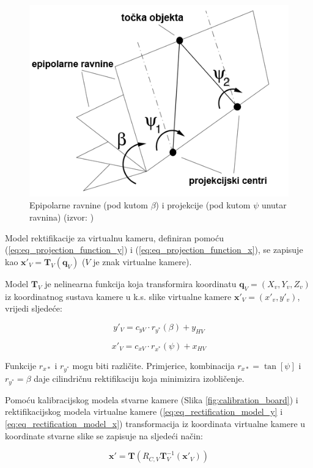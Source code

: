 \documentclass[../seminar.tex]{subfiles}
\begin{document}
\begin{figure}[ht!]
  \centering
    \includegraphics[width=.5\textwidth]{img_010_epipolar_planes_smaller.png}
   \caption{Epipolarne ravnine (pod kutom $\beta$) i projekcije (pod kutom $\psi$ unutar ravnina) (izvor: \cite{Abraham})}
  \label{fig:epipolar_planes}
\end{figure}


Model rektifikacije za virtualnu kameru, definiran pomoću (\ref{eq:eq_projection_function_y}) i (\ref{eq:eq_projection_function_x}), se zapisuje kao $\boldsymbol{x'}_V = \boldsymbol{T}_V (\boldsymbol{q}_V)$ ($V$ je znak virtualne kamere).\cite{Abraham}
 
Model $\boldsymbol{T}_V$ je nelinearna funkcija koja transformira koordinatu $\boldsymbol{q}_V = (X_v,Y_v,Z_v)$ iz koordinatnog sustava kamere u k.s. slike virtualne kamere $\boldsymbol{x'}_V = (x'_v,y'_v)$, vrijedi sljedeće:

\begin{equation}
\label{eq:eq_rectification_model_y}
y'_V = c_{yV} · r_{y^*}(\beta) + y_{HV}
\end{equation}

\begin{equation}
\label{eq:eq_rectification_model_x}
x'_V = c_{xV} · r_{x^*}(\psi) + x_{HV}
\end{equation}

Funkcije $r_{x*}$ i $r_{y^*}$ mogu biti različite. Primjerice, kombinacija $r_{x*} = \tan[\psi]$ i $r_{y^*} = \beta$ daje cilindričnu rektifikaciju koja minimizira izobličenje\cite{RoyMeunierCox}.

Pomoću kalibracijskog modela stvarne kamere (Slika \ref{fig:calibration_board}) i rektifikacijskog modela virtualne kamere (\ref{eq:eq_rectification_model_y} i \ref{eq:eq_rectification_model_x}) transformacija iz koordinata virtualne kamere u koordinate stvarne slike se zapisuje na sljedeći način:

\begin{equation}
\label{eq:eq_transformation}
\boldsymbol{x'} = \boldsymbol{T}(R_{C,V}\boldsymbol{T}^{-1}_V(\boldsymbol{x'}_V))
\end{equation}
\end{document}
